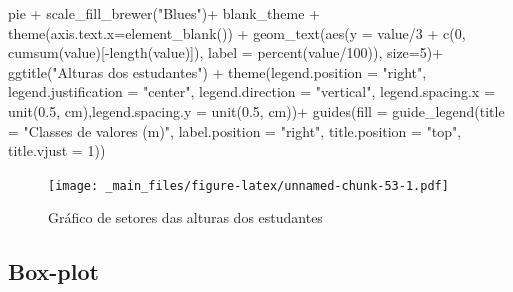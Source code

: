 \documentclass[
]{book}
\newenvironment{Shaded}{\begin{snugshade}}{\end{snugshade}}
\newcommand{\AttributeTok}[1]{\textcolor[rgb]{0.77,0.63,0.00}{#1}}
\newcommand{\DecValTok}[1]{\textcolor[rgb]{0.00,0.00,0.81}{#1}}
\newcommand{\FloatTok}[1]{\textcolor[rgb]{0.00,0.00,0.81}{#1}}
\newcommand{\FunctionTok}[1]{\textcolor[rgb]{0.00,0.00,0.00}{#1}}
\newcommand{\NormalTok}[1]{#1}
\newcommand{\SpecialCharTok}[1]{\textcolor[rgb]{0.00,0.00,0.00}{#1}}
\newcommand{\StringTok}[1]{\textcolor[rgb]{0.31,0.60,0.02}{#1}}
\begin{document}
\begin{Shaded}
\begin{Highlighting}[]
\NormalTok{pie }\SpecialCharTok{+} 
  \FunctionTok{scale\_fill\_brewer}\NormalTok{(}\StringTok{"Blues"}\NormalTok{)}\SpecialCharTok{+}
\NormalTok{  blank\_theme }\SpecialCharTok{+}
  \FunctionTok{theme}\NormalTok{(}\AttributeTok{axis.text.x=}\FunctionTok{element\_blank}\NormalTok{()) }\SpecialCharTok{+}
  \FunctionTok{geom\_text}\NormalTok{(}\FunctionTok{aes}\NormalTok{(}\AttributeTok{y =}\NormalTok{ value}\SpecialCharTok{/}\DecValTok{3} \SpecialCharTok{+} \FunctionTok{c}\NormalTok{(}\DecValTok{0}\NormalTok{, }\FunctionTok{cumsum}\NormalTok{(value)[}\SpecialCharTok{{-}}\FunctionTok{length}\NormalTok{(value)]), }
                \AttributeTok{label =} \FunctionTok{percent}\NormalTok{(value}\SpecialCharTok{/}\DecValTok{100}\NormalTok{)), }\AttributeTok{size=}\DecValTok{5}\NormalTok{)}\SpecialCharTok{+}
  \FunctionTok{ggtitle}\NormalTok{(}\StringTok{"Alturas dos estudantes"}\NormalTok{) }\SpecialCharTok{+}
  \FunctionTok{theme}\NormalTok{(}\AttributeTok{legend.position =} \StringTok{"right"}\NormalTok{, }\AttributeTok{legend.justification =} \StringTok{"center"}\NormalTok{, }\AttributeTok{legend.direction =} \StringTok{"vertical"}\NormalTok{,}
        \AttributeTok{legend.spacing.x =} \FunctionTok{unit}\NormalTok{(}\FloatTok{0.5}\NormalTok{, }\StringTok{\textquotesingle{}cm\textquotesingle{}}\NormalTok{),}\AttributeTok{legend.spacing.y =} \FunctionTok{unit}\NormalTok{(}\FloatTok{0.5}\NormalTok{, }\StringTok{\textquotesingle{}cm\textquotesingle{}}\NormalTok{))}\SpecialCharTok{+}
  \FunctionTok{guides}\NormalTok{(}\AttributeTok{fill =} \FunctionTok{guide\_legend}\NormalTok{(}\AttributeTok{title =} \StringTok{"Classes de valores (m)"}\NormalTok{,}
                             \AttributeTok{label.position =} \StringTok{"right"}\NormalTok{,}
                             \AttributeTok{title.position =} \StringTok{"top"}\NormalTok{, }\AttributeTok{title.vjust =} \DecValTok{1}\NormalTok{)) }
\end{Highlighting}
\end{Shaded}

\begin{figure}
\centering
\texttt{[image: \_main\_files/figure-latex/unnamed-chunk-53-1.pdf]}
\caption{\label{fig:unnamed-chunk-53}Gráfico de setores das alturas dos estudantes}
\end{figure}

\hypertarget{box-plot}{%
\subsection{Box-plot}\label{box-plot}}
\end{document}
